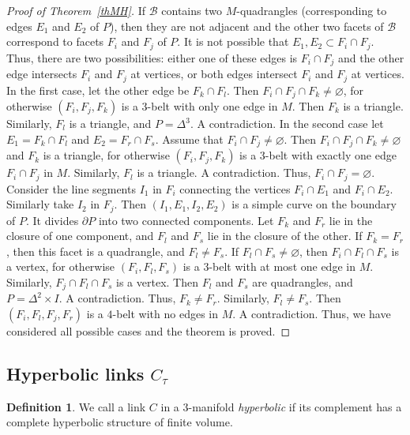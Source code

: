 \documentclass[12pt]{amsart}
\theoremstyle{definition}
\newtheorem{definition}[formula]{Definition}
\theoremstyle{remark}
\begin{document}
\begin{proof}[Proof of Theorem~\ref{thMH}]
If $\mathcal{B}$ contains two $M$-quadrangles (corresponding to edges $E_1$ and $E_2$ of $P$),
then they are not adjacent and the other two facets of $\mathcal{B}$
correspond to facets $F_i$ and $F_j$ of $P$. It is not possible that $E_1,E_2\subset F_i\cap F_j$.
Thus, there are two possibilities: either one of these edges is $F_i\cap F_j$ and the other edge intersects $F_i$ and $F_j$
at vertices, or both edges intersect $F_i$ and $F_j$ at vertices.
In the first case, let the other edge be $F_k\cap F_l$. Then $F_i\cap F_j\cap F_k\ne\varnothing$, for otherwise $(F_i,F_j,F_k)$
is a $3$-belt with only one edge in $M$. Then $F_k$ is a triangle. Similarly, $F_l$ is a triangle, and $P=\Delta^3$. A contradiction.
In the second case let $E_1=F_k\cap F_l$ and $E_2=F_r\cap F_s$.  
Assume that $F_i\cap F_j\ne \varnothing$. Then $F_i\cap F_j\cap F_k\ne\varnothing$ and $F_k$ is a triangle, for otherwise 
$(F_i,F_j,F_k)$ is a $3$-belt with exactly one edge $F_i\cap F_j$ in $M$. Similarly, $F_l$ is a triangle. A contradiction. Thus, 
$F_i\cap F_j=\varnothing$. Consider the line segments $I_1$ in $F_i$ connecting the vertices $F_i\cap E_1$ and $F_i\cap E_2$. 
Similarly take $I_2$ in $F_j$. Then $(I_1,E_1,I_2,E_2)$ is a simple curve on the boundary of $P$. It divides $\partial P$ into two connected components. Let $F_k$ and $F_r$ lie in the closure of one component, and $F_l$ and $F_s$ lie in the closure
of the other.
If $F_k=F_r$, then this facet is a quadrangle, and $F_l\ne F_s$. If $F_l\cap F_s\ne\varnothing$, then $F_i\cap F_l\cap F_s$
is a vertex, for otherwise $(F_i,F_l,F_s)$ is a $3$-belt with at most one edge in $M$. Similarly, $F_j\cap F_l\cap F_s$ is a vertex.
Then $F_l$ and $F_s$ are quadrangles, and $P=\Delta^2\times I$. A contradiction. Thus, 
$F_k\ne F_r$. Similarly, $F_l\ne F_s$. Then $(F_i,F_l,F_j,F_r)$ is a $4$-belt with no edges in $M$.  
A contradiction. Thus, we have considered all possible cases and the theorem is proved.
\end{proof}
\subsection{Hyperbolic links $C_\tau$}
\begin{definition}
We call a link $C$ in a $3$-manifold {\it hyperbolic} if its complement has a complete hyperbolic structure of finite volume.
\end{definition}
\end{document}
